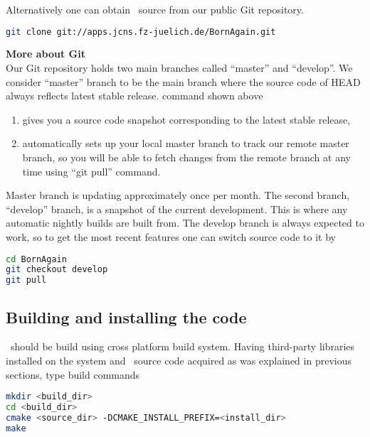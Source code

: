 \noindent
Alternatively one can obtain \BornAgain\ source from our public Git repository.
\begin{lstlisting}[language=bash, style=commandline]
git clone git://apps.jcns.fz-juelich.de/BornAgain.git 
\end{lstlisting}
\vspace*{3mm}


\noindent
{\bf\large More about Git} \\
Our Git repository holds two main branches called ``master'' and ``develop''. We consider ``master''
branch to be the main branch where the source code of HEAD always reflects latest stable release.  command shown above
\begin{enumerate}[1.]
\item gives you a source code snapshot corresponding to the latest stable release,
\item automatically sets up your local master branch to track our remote master branch, 
so you will be able to fetch changes from the remote branch at any time using ``git pull'' command.
\end{enumerate}

Master branch is updating approximately once per month.
The second branch, ``develop'' branch, is a snapshot of the current development.
This is where any automatic nightly builds are built from. The develop branch is
always expected to work, so to get the most recent features one can switch source code to it by
\begin{lstlisting}[language=bash, style=commandline]
cd BornAgain
git checkout develop
git pull
\end{lstlisting}
\vspace*{3mm}



\subsection{Building and installing the code}

\BornAgain\ should be build using  cross platform build system. 
Having third-party libraries installed on the system and \BornAgain\ source code acquired as was explained in
previous sections, type build commands
\begin{lstlisting}[language=bash, style=commandline]
mkdir <build_dir>
cd <build_dir>
cmake <source_dir> -DCMAKE_INSTALL_PREFIX=<install_dir>
make
\end{lstlisting}
\vspace*{3mm}

